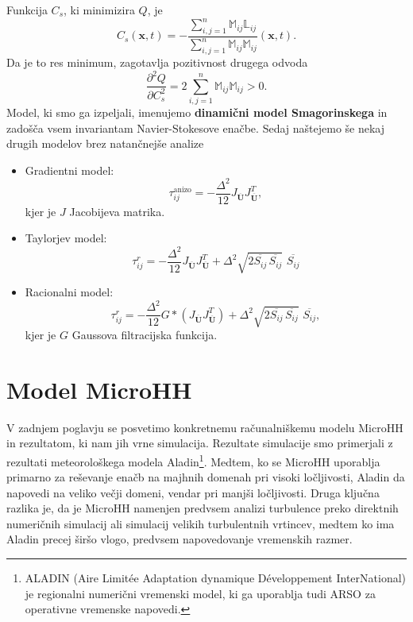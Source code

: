 \documentclass[mat2, tisk]{fmfdelo}
\newcommand{\bd}{\textbf}
\begin{document}
Funkcija $C_s$, ki minimizira $Q$, je 
\begin{equation*}
C_s(\bd{x}, t) = - \frac{\sum_{i,j=1}^n \mathbb{M}_{ij} \mathbb{L}_{ij}}{\sum_{i,j=1}^n \mathbb{M}_{ij} \mathbb{M}_{ij}}(\bd{x}, t).
\end{equation*}
Da je to res minimum, zagotavlja pozitivnost drugega odvoda
$$
\frac{\partial^2 Q}{\partial C_s^2} = 2\sum_{i,j=1}^n \mathbb{M}_{ij} \mathbb{M}_{ij} > 0.
$$
Model, ki smo ga izpeljali, imenujemo \bd{dinamični model Smagorinskega} in zadošča vsem invariantam Navier-Stokesove enačbe.
Sedaj naštejemo še nekaj drugih modelov brez natančnejše analize 
\begin{itemize}
  \item Gradientni model:
  $$
  \tau_{ij}^\text{anizo} = -\frac{\Delta^2}{12} J_{\overline{\bd{U}}} J_{\overline{\bd{U}}}^T,
  $$
  kjer je $J$ Jacobijeva matrika.
  \item Taylorjev model:
  $$
  \tau_{ij}^r = -\frac{\Delta^2}{12} J_{\overline{\bd{U}}} J_{\overline{\bd{U}}}^T + \Delta^2 \sqrt{2\overline{S_{ij}}\,\overline{S_{ij}}}\,\, \overline{S_{ij}}
  $$
  \item Racionalni model:
  $$
  \tau_{ij}^r = -\frac{\Delta^2}{12} G*(J_{\overline{\bd{U}}} J_{\overline{\bd{U}}}^T) + \Delta^2 \sqrt{2\overline{S_{ij}}\,\overline{S_{ij}}}\,\, \overline{S_{ij}},
  $$
  kjer je $G$ Gaussova filtracijska funkcija.
\end{itemize}

\section{Model MicroHH}

V zadnjem poglavju se posvetimo konkretnemu računalniškemu modelu 
MicroHH \cite{vanHeerwaarden2017MicroHH} in rezultatom, ki nam jih vrne simulacija. Rezultate 
simulacije smo primerjali z rezultati 
meteorološkega modela Aladin\footnote{ALADIN (Aire Limitée Adaptation dynamique Développement InterNational) je regionalni numerični vremenski model, ki ga uporablja tudi ARSO za operativne vremenske napovedi.}. 
Medtem, ko se MicroHH uporablja primarno za reševanje enačb na majhnih domenah pri visoki ločljivosti, 
Aladin da napovedi na veliko večji domeni, vendar pri manjši 
ločljivosti. Druga ključna razlika je, da je MicroHH namenjen 
predvsem analizi turbulence preko direktnih numeričnih 
simulacij ali simulacij velikih turbulentnih vrtincev, medtem 
ko ima Aladin precej širšo vlogo, predvsem napovedovanje vremenskih 
razmer.
\end{document}
